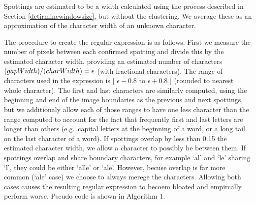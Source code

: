\documentclass[ms,electronic,twosidetoc,letterpaper,chaptercenter,parttop,lof,lot]{byumsphd}
\begin{document}
Spottings are estimated to be a width calculated using the process described in Section \ref{detirminewindowsize}, but without the clustering.
We average these as an approximation of the character width of an unknown character.

The procedure to create the regular expression is as follows. First we measure the number of pixels between each confirmed spotting and divide this by the estimated character width, providing an estimated number of characters $\text(gapWidth)/\text(charWidth) = \epsilon$ (with fractional characters). The range of characters used in the expression is 
[ $\epsilon-0.8$ to $\epsilon+0.8$ ] (rounded to nearest whole character).
 The first and last characters are similarly computed, using the beginning and end of the image boundaries as the previous and next spottings, but we additionaly allow each of those ranges to have one less character than the range computed to account for the fact that frequently first and last letters are longer than others (e.g.~capital letters at the beginning of a word, or a long tail on the last character of a word). If spottings overlap by less than 0.15 the estimated character width, we allow a character to possibly be between them.
If spottings overlap and share boundary characters, for example `al' and `le' sharing `l', they could be either `alle' or `ale'. However, becuse overlap is far more common (`ale' case) we choose to always merege the characters.  Allowing both cases causes the resulting regular expression to becoem bloated and empircally perform worse.
Pseudo code is shown in Algorithm 1.%
\end{document}
